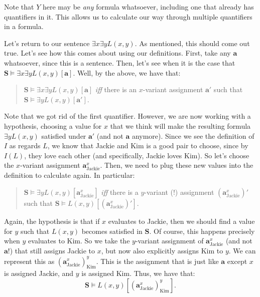 Note that $Y$ here may be \textit{any} formula whatsoever, including one that already has quantifiers in it. This allows us to calculate our way through multiple quantifiers in a formula. 


Let's return to our sentence $\exists x \exists y L(x, y)$. As mentioned, this should come out true. Let's see how this comes about using our definitions. First, take any $\mathbf{a}$ whatsoever, since this is a sentence. Then, let's see when it is the case that $\mathbf{S} \models \exists x \exists y L(x, y)[\mathbf{a}]$. Well, by the above, we have that:

\begin{quote}
	$\mathbf{S} \models \exists x \exists y L(x,y)[\mathbf{a}]$ \textit{iff} there is an $x$-variant assignment $\mathbf{a}'$ such that $\mathbf{S} \models \exists y L(x,y)[\mathbf{a}']$. 
\end{quote}

Note that we got rid of the first quantifier. However, we are now working with a hypothesis, choosing a value for $x$ that we think will make the resulting formula $\exists yL(x,y)$ satisfied under $\mathbf{a}'$ (and not $\mathbf{a}$ anymore). Since we see the definition of $I$ as regards $L$, we know that Jackie and Kim is a good pair to choose, since by $I(L)$, they love each other (and specifically, Jackie loves Kim). So let's choose the $x$-variant assignment $\mathbf{a}^x_\text{Jackie}$. Then, we need to plug these new values into the definition to calculate again. In particular:

\begin{quote}
	$\mathbf{S} \models \exists y L(x,y)[\mathbf{a}^x_\text{Jackie}]$ \textit{iff} there is a $y$-variant (!) assignment $(\mathbf{a}^x_\text{Jackie})'$ such that $\mathbf{S} \models L(x,y)[(\mathbf{a}^x_\text{Jackie})']$. 
\end{quote}

Again, the hypothesis is that if $x$ evaluates to Jackie, then we should find a value for $y$ such that $L(x, y)$ becomes satisfied in $\mathbf{S}$. Of course, this happens precisely when $y$ evaluates to Kim. So we take the $y$-variant assignment of $\mathbf{a}^x_\text{Jackie}$ (and not $\mathbf{a}$!) that still assigns Jackie to $x$, but now also explicitly assigns Kim to $y$. We can represent this as $(\mathbf{a}^x_\text{Jackie})^y_\text{Kim}$. This is the assignment that is just like $\mathbf{a}$ except $x$ is assigned Jackie, and $y$ is assigned Kim. Thus, we have that: 
\[
\mathbf{S}\models L(x, y)[(\mathbf{a}^x_\text{Jackie})^y_\text{Kim}].
\]


